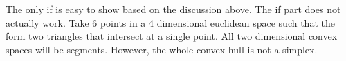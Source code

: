 \begin{remark}
	The only if is easy to show based on the discussion above. The if part does not actually work. Take 6 points in a 4 dimensional euclidean space such that the form two triangles that intersect at a single point. All two dimensional convex spaces will be segments. However, the whole convex hull is not a simplex. 
\end{remark}
